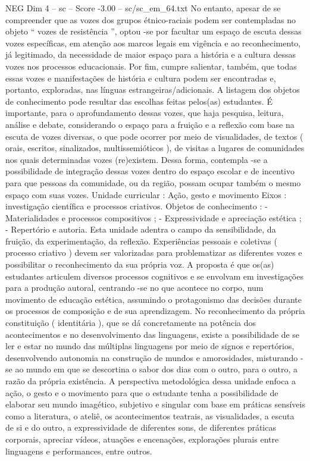\begin{textsample}{NEG Dim 4 – sc – Score -3.00 – sc/sc\_em\_64.txt}
No entanto, apesar de se compreender que as vozes dos grupos étnico-raciais podem ser contempladas no objeto “ vozes de resistência ”, optou -se por facultar um espaço de escuta dessas vozes específicas, em atenção aos marcos legais em vigência e ao reconhecimento, já legitimado, da necessidade de maior espaço para a história e a cultura dessas vozes nos processos educacionais.
Por fim, cumpre salientar, também, que todas essas vozes e manifestações de história e cultura podem ser encontradas e, portanto, exploradas, nas línguas estrangeiras/adicionais.
A listagem dos objetos de conhecimento pode resultar das escolhas feitas pelos(as) estudantes.
É importante, para o aprofundamento dessas vozes, que haja pesquisa, leitura, análise e debate, considerando o espaço para a fruição e a reflexão com base na escuta de vozes diversas, o que pode ocorrer por meio de visualidades, de textos ( orais, escritos, sinalizados, multissemióticos ), de visitas a lugares de comunidades nos quais determinadas vozes (re)existem.
Dessa forma, contempla -se a possibilidade de integração dessas vozes dentro do espaço escolar e de incentivo para que pessoas da comunidade, ou da região, possam ocupar também o mesmo espaço com suas vozes.
Unidade curricular : Ação, gesto e movimento Eixos : investigação científica e processos criativos.
Objetos de conhecimento : - Materialidades e processos compositivos ; - Expressividade e apreciação estética ; - Repertório e autoria.
Esta unidade adentra o campo da sensibilidade, da fruição, da experimentação, da reflexão.
Experiências pessoais e coletivas ( processo criativo ) devem ser valorizadas para problematizar as diferentes vozes e possibilitar o reconhecimento da sua própria voz.
A proposta é que os(as) estudantes articulem diversos processos cognitivos e se envolvam em investigações para a produção autoral, centrando -se no que acontece no corpo, num movimento de educação estética, assumindo o protagonismo das decisões durante os processos de composição e de sua aprendizagem.
No reconhecimento da própria constituição ( identitária ), que se dá concretamente na potência dos acontecimentos e no desenvolvimento das linguagens, existe a possibilidade de se ler e estar no mundo das múltiplas linguagens por meio de signos e repertórios, desenvolvendo autonomia na construção de mundos e amorosidades, misturando -se ao mundo em que se descortina o sabor dos dias com o outro, para o outro, a razão da própria existência.
A perspectiva metodológica dessa unidade enfoca a ação, o gesto e o movimento para que o estudante tenha a possibilidade de elaborar seu mundo imagético, subjetivo e singular com base em práticas sensíveis como a literatura, o ateliê, os acontecimentos teatrais, as visualidades, a escuta de si e do outro, a expressividade de diferentes sons, de diferentes práticas corporais, apreciar vídeos, atuações e encenações, explorações plurais entre linguagens e performances, entre outros.

\end{textsample}
